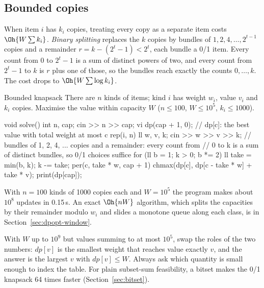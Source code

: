 \subsection{Bounded copies}

When item $i$ has $k_i$ copies, treating every copy as a separate item costs $\Oh{W \sum k_i}$. \emph{Binary splitting} replaces the
$k$ copies by bundles of $1, 2, 4, \dots, 2^{t-1}$ copies and a remainder $r = k - (2^t - 1) < 2^t$, each bundle a 0/1 item. Every
count from 0 to $2^t - 1$ is a sum of distinct powers of two, and every count from $2^t - 1$ to $k$ is $r$ plus one of those, so the
bundles reach exactly the counts $0, \dots, k$. The cost drops to $\Oh{W \sum \log k_i}$.

\begin{problem}{Bounded knapsack}
There are $n$ kinds of items; kind $i$ has weight $w_i$, value $v_i$ and $k_i$ copies. Maximise the value within capacity $W$
($n \le 100$, $W \le 10^5$, $k_i \le 1000$).
\end{problem}

\begin{code}
void solve() {
    int n, cap;
    cin >> n >> cap;
    vi dp(cap + 1, 0);  // dp[c]: the best value with total weight at most c
    rep(i, n) {
        ll w, v, k;
        cin >> w >> v >> k;
        // bundles of 1, 2, 4, ... copies and a remainder: every count from
        // 0 to k is a sum of distinct bundles, so 0/1 choices suffice
        for (ll b = 1; k > 0; b *= 2) {
            ll take = min(b, k);
            k -= take;
            per(c, take * w, cap + 1)
                chmax(dp[c], dp[c - take * w] + take * v);
        }
    }
    print(dp[cap]);
}
\end{code}

With $n = 100$ kinds of 1000 copies each and $W = 10^5$ the program makes about $10^8$ updates in 0.15\,s. An exact $\Oh{nW}$
algorithm, which splits the capacities by their remainder modulo $w_i$ and slides a monotone queue along each class, is in
Section~\ref{sec:dpopt-window}.


\begin{trick}
With $W$ up to $10^9$ but values summing to at most $10^5$, swap the roles of the two numbers: $dp[v]$ is the smallest weight that
reaches value exactly $v$, and the answer is the largest $v$ with $dp[v] \le W$. Always ask which quantity is small enough to index
the table. For plain subset-sum feasibility, a bitset makes the 0/1 knapsack 64 times faster (Section~\ref{sec:bitset}).
\end{trick}

